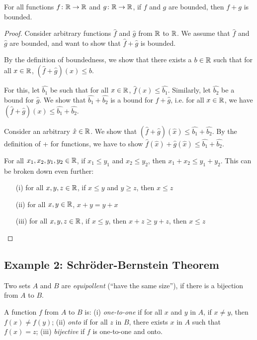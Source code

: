 \begin{theorem}
  For all functions $f\colon  \mathbb{R}\to \mathbb{R}$ and $g\colon  \mathbb{R}\to \mathbb{R}$, if $f$ and
  $g$ are bounded, then $f+g$ is bounded. 
\end{theorem}
\begin{proof}
Consider arbitrary functions $\hat{f}$ and $\hat{g}$ from $\mathbb{R}$ to $\mathbb{R}$.
We assume that $\hat{f}$ and $\hat{g}$ are bounded, and want to 
show that $\hat{f} + \hat{g}$ is bounded.

By the definition of boundedness, we show that there exists a $b \in \mathbb{R}$ such
that for all $x \in \mathbb{R}$, $(\hat{f} + \hat{g})(x) \leq b$.

For this, let $\hat{b_1}$ be such that for all $x \in \mathbb{R}$, $\hat{f}(x) \leq \hat{b_1}$.
Similarly, let $\hat{b_2}$ be a bound for $\hat{g}$.
We show that $\hat{b_1} + \hat{b_2}$ is a bound for $\hat{f} + \hat{g}$, i.e.
for all $x \in \mathbb{R}$, we have $(\hat{f} + \hat{g})(x) \leq \hat{b_1} + \hat{b_2}$.

Consider an arbitrary $\hat{x} \in \mathbb{R}$. We show that $(\hat{f} + \hat{g})(\hat{x}) \leq \hat{b_1} + \hat{b_2}$.
By the definition of + for functions, we have to show $\hat{f}(\hat{x}) + \hat{g}(\hat{x}) \leq \hat{b_1} + \hat{b_2}$.

For all $x_1, x_2, y_1, y_2 \in \mathbb{R}$, if $x_1 \leq y_1$ and $x_2 \leq y_2$, then $x_1 + x_2 \leq y_1 + y_2$. 
This can be broken down even further:

\begin{enumerate}
  \item[(i)] for all $x,y,z \in \mathbb{R}$, if $x \leq y$ and $y \geq z$, then $x \leq z$
  \item[(ii)] for all $x,y \in \mathbb{R}$, $x + y = y + x$
  \item[(iii)] for all $x,y,z \in \mathbb{R}$, if $x \leq y$, then $x + z \geq y + z$, then $x \leq z$
\end{enumerate}
\end{proof}

\subsection{Example 2: Schröder-Bernstein Theorem}

\begin{definition}
  Two sets $A$ and $B$ are \emph{equipollent} (``have the same 
  size''), if there is a bijection from $A$ to $B$.
\end{definition}

\begin{definition}
  A function $f$ from $A$ to $B$ is: 
  (i) \emph{one-to-one} if for all $x$ and $y$ in $A$, if $x \neq y$, then $f(x) \neq f(y)$;
  (ii) \emph{onto} if for all $z$ in $B$, there exists $x$ 
    in $A$ such that $f(x) = z$;
(iii) \emph{bijective} if $f$ is one-to-one and onto.
\end{definition}




